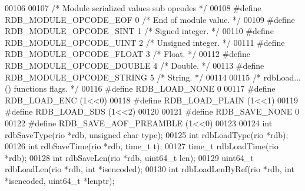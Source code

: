 \begin{DoxyCode}
00106 
00107 \textcolor{comment}{/* Module serialized values sub opcodes */}
00108 \textcolor{preprocessor}{#}\textcolor{preprocessor}{define} \textcolor{preprocessor}{RDB\_MODULE\_OPCODE\_EOF}   0   \textcolor{comment}{/* End of module value. */}
00109 \textcolor{preprocessor}{#}\textcolor{preprocessor}{define} \textcolor{preprocessor}{RDB\_MODULE\_OPCODE\_SINT}  1   \textcolor{comment}{/* Signed integer. */}
00110 \textcolor{preprocessor}{#}\textcolor{preprocessor}{define} \textcolor{preprocessor}{RDB\_MODULE\_OPCODE\_UINT}  2   \textcolor{comment}{/* Unsigned integer. */}
00111 \textcolor{preprocessor}{#}\textcolor{preprocessor}{define} \textcolor{preprocessor}{RDB\_MODULE\_OPCODE\_FLOAT} 3   \textcolor{comment}{/* Float. */}
00112 \textcolor{preprocessor}{#}\textcolor{preprocessor}{define} \textcolor{preprocessor}{RDB\_MODULE\_OPCODE\_DOUBLE} 4  \textcolor{comment}{/* Double. */}
00113 \textcolor{preprocessor}{#}\textcolor{preprocessor}{define} \textcolor{preprocessor}{RDB\_MODULE\_OPCODE\_STRING} 5  \textcolor{comment}{/* String. */}
00114 
00115 \textcolor{comment}{/* rdbLoad...() functions flags. */}
00116 \textcolor{preprocessor}{#}\textcolor{preprocessor}{define} \textcolor{preprocessor}{RDB\_LOAD\_NONE}   0
00117 \textcolor{preprocessor}{#}\textcolor{preprocessor}{define} \textcolor{preprocessor}{RDB\_LOAD\_ENC}    \textcolor{preprocessor}{(}1\textcolor{preprocessor}{<<}0\textcolor{preprocessor}{)}
00118 \textcolor{preprocessor}{#}\textcolor{preprocessor}{define} \textcolor{preprocessor}{RDB\_LOAD\_PLAIN}  \textcolor{preprocessor}{(}1\textcolor{preprocessor}{<<}1\textcolor{preprocessor}{)}
00119 \textcolor{preprocessor}{#}\textcolor{preprocessor}{define} \textcolor{preprocessor}{RDB\_LOAD\_SDS}    \textcolor{preprocessor}{(}1\textcolor{preprocessor}{<<}2\textcolor{preprocessor}{)}
00120 
00121 \textcolor{preprocessor}{#}\textcolor{preprocessor}{define} \textcolor{preprocessor}{RDB\_SAVE\_NONE} 0
00122 \textcolor{preprocessor}{#}\textcolor{preprocessor}{define} \textcolor{preprocessor}{RDB\_SAVE\_AOF\_PREAMBLE} \textcolor{preprocessor}{(}1\textcolor{preprocessor}{<<}0\textcolor{preprocessor}{)}
00123 
00124 \textcolor{keywordtype}{int} rdbSaveType(rio *rdb, \textcolor{keywordtype}{unsigned} \textcolor{keywordtype}{char} type);
00125 \textcolor{keywordtype}{int} rdbLoadType(rio *rdb);
00126 \textcolor{keywordtype}{int} rdbSaveTime(rio *rdb, time\_t t);
00127 time\_t rdbLoadTime(rio *rdb);
00128 \textcolor{keywordtype}{int} rdbSaveLen(rio *rdb, uint64\_t len);
00129 uint64\_t rdbLoadLen(rio *rdb, \textcolor{keywordtype}{int} *isencoded);
00130 \textcolor{keywordtype}{int} rdbLoadLenByRef(rio *rdb, \textcolor{keywordtype}{int} *isencoded, uint64\_t *lenptr);

\end{DoxyCode}

